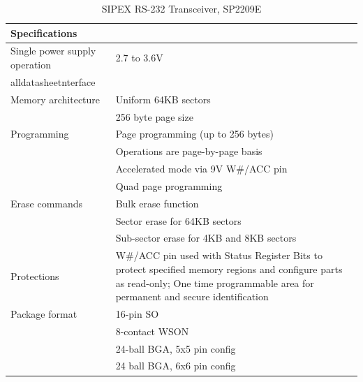 \begin{table}
    \centering
    \label{fig:SP2209E}%
    \caption{SIPEX RS-232 Transceiver, SP2209E \autocite{alldatasheet.comSP2209EDatasheetPDF}}
    \begin{tabular}{|p{4cm}|p{12cm}|}
      \hline\rowcolor{gray!30}
  
      \textbf{Specifications} &  \\
      \hline
  
      Single power supply operation & 2.7 to 3.6V \\alldatasheetnterface \\
      \hline
  
      Memory architecture & Uniform 64KB sectors \\
      & 256 byte page size \\
      \hline
  
      Programming & Page programming (up to 256 bytes) \\
      & Operations are page-by-page basis \\
      & Accelerated mode via 9V W\#/ACC pin \\
      & Quad page programming \\
      \hline
  
      Erase commands & Bulk erase function \\
       & Sector erase for 64KB sectors \\
       & Sub-sector erase for 4KB and 8KB sectors \\
      \hline
  
      Protections & W\#/ACC pin used with Status Register Bits to protect specified memory regions and configure parts as read-only; One time programmable area for permanent and secure identification \\
      \hline
  
      Package format & 16-pin SO \\
      & 8-contact WSON \\
      & 24-ball BGA, 5x5 pin config \\
      & 24 ball BGA, 6x6 pin config \\
      \hline
  
    \end{tabular}
\end{table}

